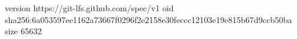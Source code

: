 version https://git-lfs.github.com/spec/v1
oid sha256:6a053597ee1162a73667f0296f2e2158e30feccc12103e19e815b67d9ccb50ba
size 65632
